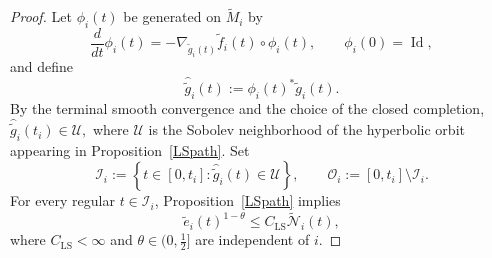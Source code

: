 \documentclass{amsart}
\begin{document}
\begin{proof}
\noindent Let \(\phi_i(t)\) be generated on \(\widetilde M_i\) by
\[
        \frac{d}{dt}\phi_i(t)
        =
        -\nabla_{\widetilde g_i(t)}
        \widetilde f_i(t)\circ\phi_i(t),
        \qquad
        \phi_i(0)=\operatorname{Id},
\]
and define
\[
        \widehat{\widetilde g}_i(t)
        :=
        \phi_i(t)^*\widetilde g_i(t).
\]
By the terminal smooth convergence and the choice of the closed
completion,
$\widehat{\widetilde g}_i(t_i)\in\mathcal U,$
where \(\mathcal U\) is the Sobolev neighborhood of the hyperbolic orbit
appearing in Proposition~\ref{LSpath}.  Set
\[
        \mathcal I_i
        :=
        \left\{
        t\in[0,t_i]:
        \widehat{\widetilde g}_i(t)\in\mathcal U
        \right\},
        \qquad
        \mathcal O_i
        :=
        [0,t_i]\setminus\mathcal I_i .
\]
For every regular \(t\in\mathcal I_i\), Proposition~\ref{LSpath}
implies
\begin{equation}
\label{eq:LS-on-pulled-back-core}
        \widetilde e_i(t)^{1-\theta}
        \leq
        C_{\mathrm{LS}}
        \widetilde{\mathcal N}_i(t),
\end{equation}
where \(C_{\mathrm{LS}}<\infty\) and
\(\theta\in(0,\frac12]\) are independent of \(i\).


\end{proof}
\end{document}
